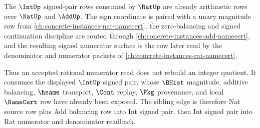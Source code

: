 \begin{lemma}
\label{lem:int-rat-signed-pair-dependency-lattice}
The $\IntUp$ signed-pair rows consumed by $\RatUp$ are already arithmetic rows over $\NatUp$ and $\AddUp$. The sign coordinate is paired with a unary magnitude row from \autoref{ch:concrete-instances-nat-namecert}, the zero-balancing and signed continuation discipline are routed through \autoref{ch:concrete-instances-add-namecert}, and the resulting signed numerator surface is the row later read by the denominator and numerator packets of \autoref{ch:concrete-instances-rat-namecert}.
\end{lemma}

Thus an accepted rational numerator read does not rebuild an integer quotient. It consumes the displayed $\IntUp$ signed pair, whose $\BHist$ magnitude, additive balancing, $\hsame$ transport, $\Cont$ replay, $\Pkg$ provenance, and local $\NameCert$ row have already been exposed. The sibling edge is therefore Nat source row plus Add balancing row into Int signed pair, then Int signed pair into Rat numerator and denominator readback.
